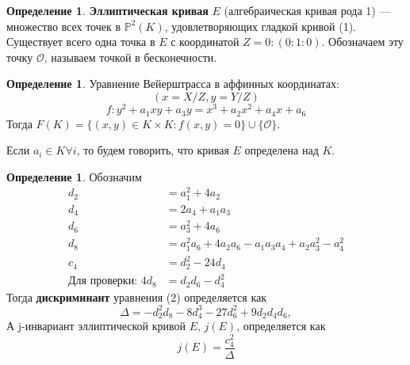 \documentclass[11pt]{article}
\newcommand{\PP}{{{\mathbb P}}}
\newcommand*{\union}{\mathbin{\cup}}
\newcommand{\bigO}{\mathcal{O}}
\theoremstyle{definition}
\newtheorem{definition}[theorem]{Определение}
\begin{document}
            \begin{definition} 
                \textbf{Эллиптическая кривая} $E$ (алгебраическая кривая рода 1) — множество всех точек в $\PP^2(K)$, удовлетворяющих гладкой кривой (1). Существует всего одна точка в $E$ с координатой $Z=0: (0:1:0)$. Обозначаем эту точку $\bigO$, называем точкой в бесконечности. 
            \end{definition}
            
            \begin{definition} 
                Уравнение Вейерштрасса в аффинных координатах: 
                \[
                (x=X/Z, y=Y/Z)
                \]
                \begin{equation}
                    f: y^2+a_1xy + a_3y = x^3 + a_2x^2 + a_4x + a_6
                \end{equation}
                Тогда $F(K) = \{ (x,y) \in K \times K: f(x,y)=0 \} \union \{\bigO\}$.
                
                Если $a_i \in K \forall i$, то будем говорить, что кривая $E$ определена над $K$.
            \end{definition}
            
            \begin{definition}
                Обозначим
                \begin{align}
                    d_2 &= a_1^2 + 4a_2 \\ \nonumber
                    d_4 &= 2a_4 + a_1a_3 \\ \nonumber
                    d_6 &= a_3^2 + 4a_6 \\ \nonumber
                    d_8 &= a_1^2a_6 + 4a_2a_6 - a_1a_3a_4 + a_2a_3^2 - a_4^2 \\ \nonumber
                    c_4 &= d_2^2 - 24d_4 \\ \nonumber
                    \text{Для проверки: } 4d_8 &= d_2d_6 - d_4^2
                \end{align}
                Тогда \textbf{дискриминант} уравнения (2) определяется как 
                \begin{equation}
                    \Delta = -d_2^2d_8 - 8d_4^3-27d_6^2+9d_2d_4d_6,
                \end{equation}
                А j-инвариант эллиптической кривой $E$, $j(E)$, определяется как 
                \begin{equation}
                    j(E) = \frac{c_4^2}{\Delta}
                \end{equation}
            \end{definition}
            
\end{document}
